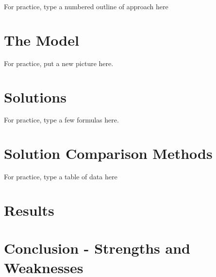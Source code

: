\documentclass[12pt]{article}   %
\begin{document}
For practice, type a numbered outline of approach here

\section{The Model}

For practice, put a new picture here.

\section{Solutions}

For practice, type a few formulas here.

\section{Solution Comparison Methods}

For practice, type a table of data here

\section{Results}

\section{Conclusion - Strengths and Weaknesses}

\newpage %
\end{document}

